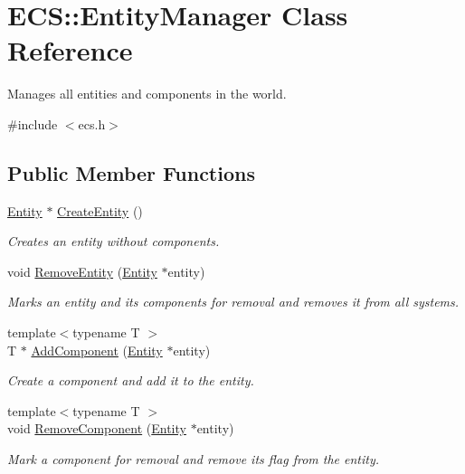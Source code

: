 \hypertarget{class_e_c_s_1_1_entity_manager}{\section{E\-C\-S\-:\-:Entity\-Manager Class Reference}
\label{class_e_c_s_1_1_entity_manager}
}


Manages all entities and components in the world.  




{\ttfamily \#include $<$ecs.\-h$>$}

\subsection*{Public Member Functions}
\begin{DoxyCompactItemize}
\item 
\hyperlink{class_e_c_s_1_1_entity}{Entity} $\ast$ \hyperlink{class_e_c_s_1_1_entity_manager_a5029d8ac52b5e171acf9f98d6513e87b}{Create\-Entity} ()
\begin{DoxyCompactList}\small\item\em Creates an entity without components. \end{DoxyCompactList}\item 
void \hyperlink{class_e_c_s_1_1_entity_manager_ab469ce55513336256b521a8af38faeca}{Remove\-Entity} (\hyperlink{class_e_c_s_1_1_entity}{Entity} $\ast$entity)
\begin{DoxyCompactList}\small\item\em Marks an entity and its components for removal and removes it from all systems. \end{DoxyCompactList}\item 
{\footnotesize template$<$typename T $>$ }\\T $\ast$ \hyperlink{class_e_c_s_1_1_entity_manager_a4c1d473501404323a532524f6afcbdfb}{Add\-Component} (\hyperlink{class_e_c_s_1_1_entity}{Entity} $\ast$entity)
\begin{DoxyCompactList}\small\item\em Create a component and add it to the entity. \end{DoxyCompactList}\item 
{\footnotesize template$<$typename T $>$ }\\void \hyperlink{class_e_c_s_1_1_entity_manager_a3ffccf0260e106f39192872cf2cd47a0}{Remove\-Component} (\hyperlink{class_e_c_s_1_1_entity}{Entity} $\ast$entity)
\begin{DoxyCompactList}\small\item\em Mark a component for removal and remove its flag from the entity. \end{DoxyCompactList}\end{DoxyCompactItemize}


